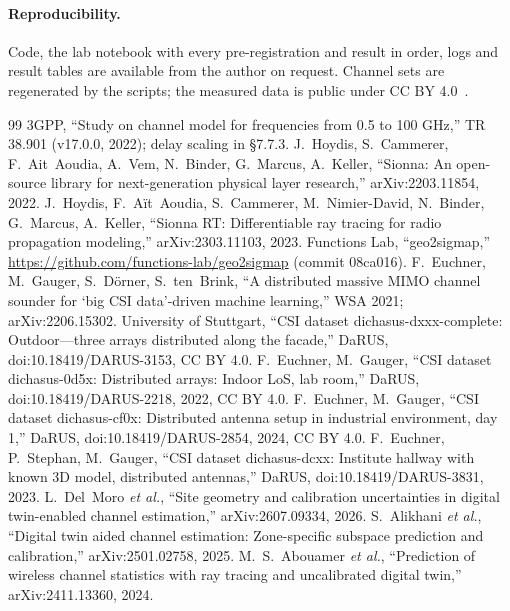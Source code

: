\documentclass[11pt]{article}
\begin{document}
\paragraph{Reproducibility.} Code, the lab notebook with every
pre-registration and result in order, logs and result tables are available
from the author on request. Channel sets are regenerated by the scripts; the measured data is
public under CC BY 4.0~\cite{dichasusdata}.

\begin{thebibliography}{99}\small
{} 3GPP, ``Study on channel model for frequencies from 0.5 to 100 GHz,'' TR 38.901 (v17.0.0, 2022); delay scaling in \S7.7.3.
 J.~Hoydis, S.~Cammerer, F.~Ait~Aoudia, A.~Vem, N.~Binder, G.~Marcus, A.~Keller, ``Sionna: An open-source library for next-generation physical layer research,'' arXiv:2203.11854, 2022.
 J.~Hoydis, F.~A\"it~Aoudia, S.~Cammerer, M.~Nimier-David, N.~Binder, G.~Marcus, A.~Keller, ``Sionna RT: Differentiable ray tracing for radio propagation modeling,'' arXiv:2303.11103, 2023.
 Functions Lab, ``geo2sigmap,'' \url{https://github.com/functions-lab/geo2sigmap} (commit 08ca016).
 F.~Euchner, M.~Gauger, S.~D\"orner, S.~ten~Brink, ``A distributed massive MIMO channel sounder for `big CSI data'-driven machine learning,'' WSA 2021; arXiv:2206.15302.
 University of Stuttgart, ``CSI dataset dichasus-dxxx-complete: Outdoor---three arrays distributed along the facade,'' DaRUS, doi:10.18419/DARUS-3153, CC BY 4.0.
 F.~Euchner, M.~Gauger, ``CSI dataset dichasus-0d5x: Distributed arrays: Indoor LoS, lab room,'' DaRUS, doi:10.18419/DARUS-2218, 2022, CC BY 4.0.
 F.~Euchner, M.~Gauger, ``CSI dataset dichasus-cf0x: Distributed antenna setup in industrial environment, day 1,'' DaRUS, doi:10.18419/DARUS-2854, 2024, CC BY 4.0.
 F.~Euchner, P.~Stephan, M.~Gauger, ``CSI dataset dichasus-dcxx: Institute hallway with known 3D model, distributed antennas,'' DaRUS, doi:10.18419/DARUS-3831, 2023.
 L.~Del~Moro \emph{et al.}, ``Site geometry and calibration uncertainties in digital twin-enabled channel estimation,'' arXiv:2607.09334, 2026.
 S.~Alikhani \emph{et al.}, ``Digital twin aided channel estimation: Zone-specific subspace prediction and calibration,'' arXiv:2501.02758, 2025.
 M.~S.~Abouamer \emph{et al.}, ``Prediction of wireless channel statistics with ray tracing and uncalibrated digital twin,'' arXiv:2411.13360, 2024.

\end{thebibliography}
\end{document}
